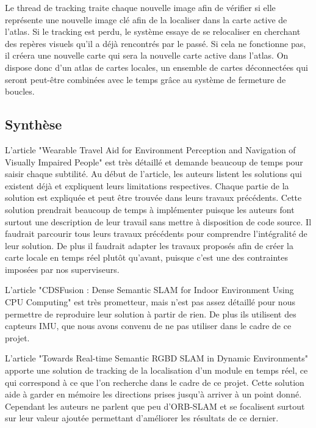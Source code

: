 \documentclass[11pt]{article}
\begin{document}
          Le thread de tracking traite chaque nouvelle image afin de vérifier si elle représente une nouvelle image clé afin de la localiser
          dans la carte active de l'atlas. Si le tracking est perdu, le système essaye de se relocaliser en cherchant des repères visuels 
          qu'il a déjà rencontrés par le passé. Si cela ne fonctionne pas, il créera une nouvelle carte qui sera la nouvelle carte active dans l'atlas.
          On dispose donc d'un atlas de cartes locales, un ensemble de cartes déconnectées qui seront peut-être combinées avec le temps grâce au 
          système de fermeture de boucles.

        \clearpage

    \subsection{Synthèse}
      L'article "Wearable Travel Aid for Environment Perception and Navigation of Visually Impaired People" est très détaillé et demande beaucoup 
      de temps pour saisir chaque subtilité.
      Au début de l'article, les auteurs listent les solutions qui existent déjà et expliquent leurs limitations respectives. 
      Chaque partie de la solution est expliquée et peut être trouvée dans leurs travaux précédents. Cette solution prendrait beaucoup de temps
      à implémenter puisque les auteurs font surtout une description de leur travail sans mettre à disposition de code source. 
      Il faudrait parcourir tous leurs travaux précédents pour comprendre l'intégralité de leur solution. De plus il faudrait adapter les travaux
      proposés afin de créer la carte locale en temps réel plutôt qu'avant, puisque c'est une des contraintes imposées par nos superviseurs. 

      L'article "CDSFusion : Dense Semantic SLAM for Indoor Environment Using CPU Computing" est très prometteur, mais n'est pas assez détaillé 
      pour nous permettre de reproduire leur solution à partir de rien. De plus ils utilisent des capteurs IMU, que nous avons convenu de ne pas 
      utiliser dans le cadre de ce projet.

      L'article "Towards Real-time Semantic RGBD SLAM in Dynamic Environments" apporte une solution de tracking de la localisation 
      d'un module en temps réel, ce qui correspond à ce que l'on recherche dans le cadre de ce projet. Cette solution aide à garder en 
      mémoire les directions prises jusqu'à arriver à un point donné. Cependant les auteurs ne parlent que peu d'ORB-SLAM et se focalisent 
      surtout sur leur valeur ajoutée permettant d'améliorer les résultats de ce dernier.
\end{document}
